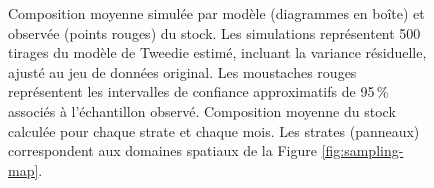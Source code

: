 \begin{figure}[htb]
    \centering
    \caption{Composition moyenne simulée par modèle (diagrammes en boîte) et observée (points rouges) du stock. Les simulations représentent 500 tirages du modèle de Tweedie estimé, incluant la variance résiduelle, ajusté au jeu de données original. Les moustaches rouges représentent les intervalles de confiance approximatifs de 95\,\% associés à l'échantillon observé. Composition moyenne du stock calculée pour chaque strate et chaque mois. Les strates (panneaux) correspondent aux domaines spatiaux de la Figure \ref{fig:sampling-map}.}
    \label{fig:posterior-size}
\end{figure}
